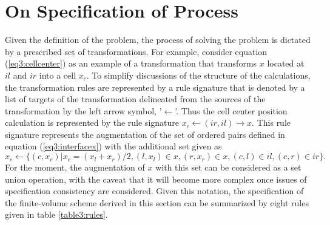 \documentclass[10pt,epsf,letterpaper,twoside]{book}
\begin{document}
\section{On Specification of Process}

Given the definition of the problem, the process of solving the
problem is dictated by a prescribed set of transformations.  For
example, consider equation (\ref{eq3:cellcenter}) as an example of a
transformation that transforms $x$ located at $il$ and $ir$ into a
cell $x_c$.  To simplify discussions of the structure of the
calculations, the transformation rules are represented by a rule
signature that is denoted by a list of targets of the transformation
delineated from the sources of the transformation by the left arrow
symbol, '$\leftarrow$'.  Thus the cell center position calculation is
represented by the rule signature $x_c \leftarrow (ir,il)\rightarrow x$.
This rule signature represents the augmentation of the set of ordered
pairs defined in equation (\ref{eq3:interfacex}) with the additional
set given as
\begin{equation}
x_c \leftarrow\lbrace (c, x_c) |  x_c = (x_l + x_r)/2,
                               (l,x_l) \in x, (r,x_r) \in x, 
                               (c,l) \in il, (c,r) \in ir \rbrace.
\end{equation}
For the moment, the augmentation of $x$ with this set can be
considered as a set union operation, with the caveat that it will
become more complex once issues of specification consistency are
considered.  Given this notation, the specification of the
finite-volume scheme derived in this section can be summarized by
eight rules given in table \ref{table3:rules}.
\end{document}
